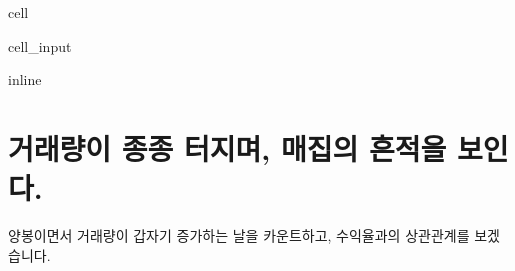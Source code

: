 \documentclass[letterpaper,10pt,english]{jupyterBook}
\begin{document}
\begin{sphinxuseclass}{cell}\begin{sphinxVerbatimInput}

\begin{sphinxuseclass}{cell_input}
\begin{sphinxVerbatim}[commandchars=\\\{\}]
   
 inline
   
   
   
  
\end{sphinxVerbatim}

\end{sphinxuseclass}\end{sphinxVerbatimInput}

\end{sphinxuseclass}

\section{거래량이 종종 터지며, 매집의 흔적을 보인다.}
\label{\detokenize{chapter5/5.1.4_Hypothesis_4:id1}}\label{\detokenize{chapter5/5.1.4_Hypothesis_4::doc}}
\sphinxAtStartPar
양봉이면서 거래량이 갑자기 증가하는 날을 카운트하고, 수익율과의 상관관계를 보겠습니다.
\end{document}
